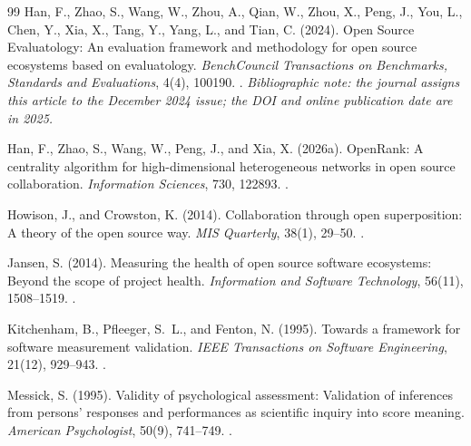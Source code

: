 \begin{thebibliography}{99}
Han, F., Zhao, S., Wang, W., Zhou, A., Qian, W., Zhou, X., Peng, J., You, L., Chen, Y., Xia, X., Tang, Y., Yang, L., and Tian, C. (2024).
Open Source Evaluatology: An evaluation framework and methodology for open source ecosystems based on evaluatology.
\emph{BenchCouncil Transactions on Benchmarks, Standards and Evaluations}, 4(4), 100190.
.
\emph{Bibliographic note: the journal assigns this article to the December 2024 issue; the DOI and online publication date are in 2025.}

Han, F., Zhao, S., Wang, W., Peng, J., and Xia, X. (2026a).
OpenRank: A centrality algorithm for high-dimensional heterogeneous networks in open source collaboration.
\emph{Information Sciences}, 730, 122893.
.

Howison, J., and Crowston, K. (2014).
Collaboration through open superposition: A theory of the open source way.
\emph{MIS Quarterly}, 38(1), 29--50.
.

Jansen, S. (2014).
Measuring the health of open source software ecosystems: Beyond the scope of project health.
\emph{Information and Software Technology}, 56(11), 1508--1519.
.

Kitchenham, B., Pfleeger, S.~L., and Fenton, N. (1995).
Towards a framework for software measurement validation.
\emph{IEEE Transactions on Software Engineering}, 21(12), 929--943.
.

Messick, S. (1995).
Validity of psychological assessment: Validation of inferences from persons' responses and performances as scientific inquiry into score meaning.
\emph{American Psychologist}, 50(9), 741--749.
.

\end{thebibliography}
\clearpage
\begingroup
\renewcommand{\bibsection}{\section*{References\enspace{\normalfont\sffamily\fontsize{11}{14}\selectfont continued}}}

